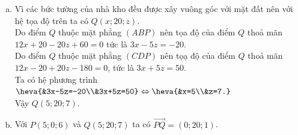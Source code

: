 \begin{bt}
{\begin{enumerate}[a)]
\begin{itemize}
\[\begin{vmatrix}
					20 & 1\\
					0 & -3
				\end{vmatrix};
				\begin{vmatrix}
					1 & 0\\
					-3 & -5
				\end{vmatrix};
				\begin{vmatrix}
					0 & 20\\
					-5 & 0
				\end{vmatrix}
				\right)=\left(-60;-5;100\right)\]	
				Mà mặt phẳng $(ABP)$ đi qua điểm $A(10;0;9)$ nên có phương trình là
				$$-60(x-10)-5(y-0)+100(z-9)=0 \Leftrightarrow 12x+y-20z+60=0.$$
				\item Do mặt phẳng $(CDP)$ có cặp véc-tơ chỉ phương là $\vec{DP}=(5;0;-3)$, $\vec{DC}=(0;20;1)$ nên có một véc-tơ pháp tuyến là
				$$[\vec{DP},\vec{DC}]=\left(\left|\begin{array}{cc}
					0 & -3\\
					20 & 1
				\end{array}\right|;\left|\begin{array}{cc}
					-3 & 5\\
					1 & 0
				\end{array}\right|;\left|\begin{array}{cc}
					5 & 0\\
					0 & 20
				\end{array}\right|\right)=(60;-5;100).$$
				Mà mặt phẳng $(CDP)$ đi qua điểm $D(0;0;9)$ nên có phương trình là
				$$60(x-0)-5(y-0)+100(z-9)=0 \Leftrightarrow 12x-y+20z-180=0.$$
			\end{itemize}
			\item Vì các bức tường của nhà kho đều được xây vuông góc với mặt đất nên với hệ tọa độ trên ta có $Q(x;20;z)$.\\
			Do điểm $Q$ thuộc mặt phẳng $(ABP)$ nên tọa độ của điểm $Q$ thoả mãn $12x+20-20z+60=0$ tức là $3x-5z=-20$.\\
			Do điểm $Q$ thuộc mặt phẳng $(CDP)$ nên tọạ độ của điểm $Q$ thoả mãn $12x-20+20z-180=0$, tức là $3x+5z=50$.\\
			Ta có hệ phương trình $\heva{&3x-5z=-20\\&3x+5z=50} \Leftrightarrow \heva{&x=5\\&z=7.}$\\
			Vậy $Q(5;20;7)$.
			\item Với $P(5;0;6)$ và $Q(5;20;7)$ ta có $\vec{PQ}=(0;20;1)$.
		\end{enumerate}
	}
\end{bt}

